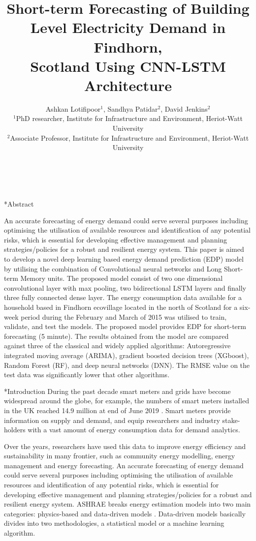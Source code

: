 \documentclass[twocolumn, a4paper,10pt]{article}
\title{%
Short-term Forecasting of Building Level Electricity Demand in Findhorn,\\	%
\vspace{4pt}
Scotland Using CNN-LSTM Architecture %
}
\author{
Ashkan Lotifipoor$^1$, Sandhya Patidar$^2$, David Jenkins$^2$\\ %
$^1$PhD researcher, Institute for Infrastructure and Environment, Heriot-Watt University\\ %
$^2$Associate Professor, Institute for Infrastructure and Environment, Heriot-Watt University\\ %
\\ %
\\ %
} %
\date{\vspace{-0.5cm}}	%
\makeatletter
\renewcommand\section{\@startsection{section}{1}{\z@}{0.25cm}{0.1cm}{\normalfont\large\bfseries}}
\makeatother
\begin{document}
\maketitle

\section*{Abstract}	%
\addtocounter{section}{1}
An accurate forecasting of energy demand could serve several purposes including optimising the utilisation of available resources and identification of any potential risks, which is essential for developing effective management and planning strategies/policies for a robust and resilient energy system. This paper is aimed to develop a novel deep learning based energy demand prediction (EDP) model by utilising the combination of Convolutional neural networks and Long Short-term Memory units. The proposed model consist of two one dimensional convolutional layer with max pooling, two bidirectional LSTM layers and finally three fully connected dense layer. The energy consumption data available for a household based in Findhorn ecovillage located in the north of Scotland for a six-week period during the February and March of 2015 was utilised to train, validate, and test the models. The proposed model provides EDP for short-term forecasting (5 minute). The results obtained from the model are compared against three of the classical and widely applied algorithms: Autoregressive integrated moving average (ARIMA), gradient boosted decision trees (XGboost), Random Forest (RF), and deep neural networks (DNN). The RMSE value on the test data was significantly lower that other algorithms.

\section*{Introduction}
During the past decade smart meters and grids have become widespread around the globe, for example, the numbers of smart meters installed in the UK reached 14.9 million at end of June 2019 \citep{RN1251}. Smart meters provide information on supply and demand, and equip researchers and industry stake-holders with a vast amount of energy consumption data for demand analytics. 

Over the years, researchers have used this data to improve energy efficiency and sustainability in many frontier, such as community energy modelling, energy management and energy forecasting. An accurate forecasting of energy demand could serve several purposes including optimising the utilisation of available resources and identification of any potential risks, which is essential for developing effective management and planning strategies/policies for a robust and resilient energy system. ASHRAE breaks energy estimation models into two main categories: physics-based and data-driven models \citep{RN1250}. Data-driven models basically divides into two methodologies, a statistical model or a machine learning algorithm.
\end{document}
